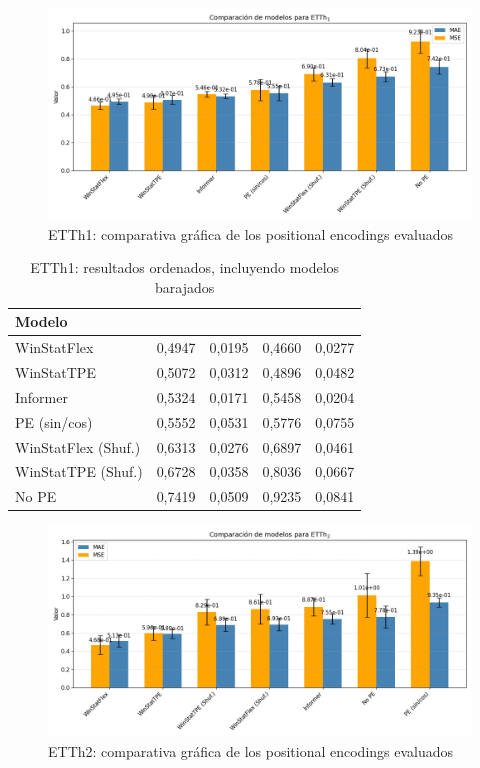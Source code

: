 \begin{figure}[!ht]
	\centering
	\includegraphics[scale=0.475]{img/etth1fin}
	\caption{ETTh1: comparativa gráfica de los positional encodings evaluados}
	\label{etth1fin}
\end{figure}

\begin{table}[ht]
	\centering
	\begin{tabular}{l|N|N|N|N}
		\toprule
		Modelo &  &  &  &  \\
		\midrule
		WinStatFlex            & 0,4947 & 0,0195 & 0,4660 & 0,0277 \\
		WinStatTPE             & 0,5072 & 0,0312 & 0,4896 & 0,0482 \\
		Informer               & 0,5324 & 0,0171 & 0,5458 & 0,0204 \\
		PE (sin/cos)           & 0,5552 & 0,0531 & 0,5776 & 0,0755 \\
		WinStatFlex (Shuf.)    & 0,6313 & 0,0276 & 0,6897 & 0,0461 \\
		WinStatTPE (Shuf.)     & 0,6728 & 0,0358 & 0,8036 & 0,0667 \\
		No PE                  & 0,7419 & 0,0509 & 0,9235 & 0,0841 \\
		\bottomrule
	\end{tabular}
	\caption{ETTh1: resultados ordenados, incluyendo modelos barajados}
	\label{etth1fintab}
\end{table}

\begin{figure}[!ht]
	\centering
	\includegraphics[scale=0.475]{img/etth2fin}
	\caption{ETTh2: comparativa gráfica de los positional encodings evaluados}
	\label{etth2fin}
\end{figure}




